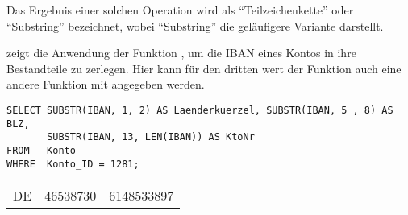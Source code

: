           \begin{merke}
            Das Ergebnis einer solchen Operation wird als \enquote{Teilzeichenkette} oder \enquote{Substring} bezeichnet, wobei \enquote{Substring} die geläufigere Variante darstellt.
          \end{merke}
           zeigt die Anwendung der Funktion , um die IBAN eines Kontos in ihre Bestandteile zu zerlegen. Hier kann für den dritten wert der Funktion auch eine andere Funktion mit angegeben werden.
          \begin{lstlisting}[language=oracle_sql,caption={Die Anwendung der Funktion \languageorasql{SUBSTR}},label=sql03_05]
SELECT SUBSTR(IBAN, 1, 2) AS Laenderkuerzel, SUBSTR(IBAN, 5 , 8) AS BLZ,
       SUBSTR(IBAN, 13, LEN(IBAN)) AS KtoNr
FROM   Konto
WHERE  Konto_ID = 1281;
          \end{lstlisting}
          \begin{center}
            \begin{small}
              \tablehead{}
              \begin{oraclesql}
                \begin{supertabular}{lrr}
                  DE & 46538730 & 6148533897 \\
                \end{supertabular}
              \end{oraclesql}
            \end{small}
          \end{center}
